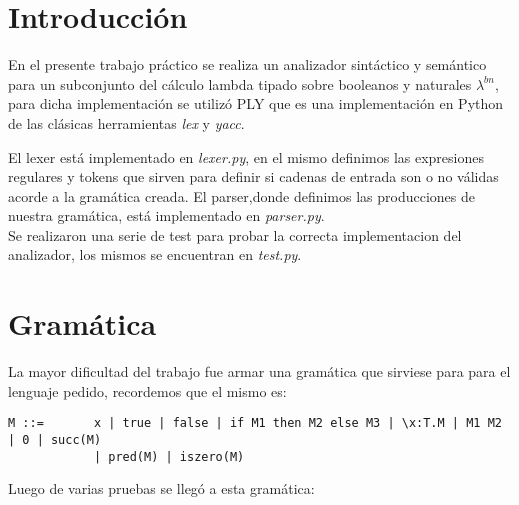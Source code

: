 \documentclass[spanish, a4paper]{article}
\begin{document}
\fecha{\today}


\maketitle


\newpage
\section{Introducción}
En el presente trabajo práctico se realiza un analizador sintáctico y semántico para un subconjunto del cálculo lambda tipado sobre booleanos y naturales $\lambda^{bn}$, para dicha implementación se utilizó PLY que es una implementación en Python de las clásicas herramientas \textit{lex} y \textit{yacc}.

El lexer está implementado en \textit{lexer.py}, en el mismo definimos las expresiones regulares y tokens que sirven para definir si cadenas de entrada son o no válidas acorde a la gramática creada. El parser,donde definimos las producciones de nuestra gramática, está implementado en \textit{parser.py}.\\
Se realizaron una serie de test para probar la correcta implementacion del analizador, los mismos se encuentran en \textit{test.py}.

\newpage
\section{Gramática}

La mayor dificultad del trabajo fue armar una gramática que sirviese para para el lenguaje pedido, recordemos que el mismo es:

\begin{verbatim}
M ::= 		x | true | false | if M1 then M2 else M3 | \x:T.M | M1 M2 | 0 | succ(M) 
            | pred(M) | iszero(M)
\end{verbatim}

Luego de varias pruebas se llegó a esta gramática:
\end{document}
